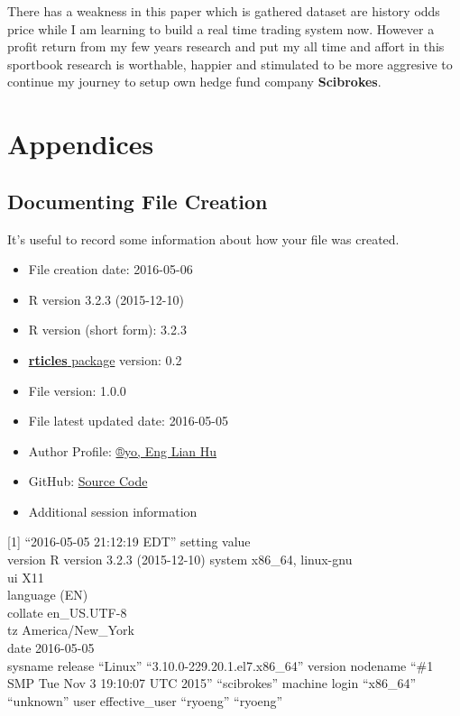 \documentclass[article]{jss}
\providecommand{\tightlist}{%
  \setlength{\itemsep}{0pt}\setlength{\parskip}{0pt}}
\begin{document}
There has a weakness in this paper which is gathered dataset are history
odds price while I am learning to build a real time trading system now.
However a profit return from my few years research and put my all time
and affort in this sportbook research is worthable, happier and
stimulated to be more aggresive to continue my journey to setup own
hedge fund company \textbf{Scibrokes}.

\section{Appendices}\label{appendices}

\subsection{Documenting File Creation}\label{documenting-file-creation}

It's useful to record some information about how your file was created.

\begin{itemize}
\tightlist
\item
  File creation date: 2016-05-06
\item
  R version 3.2.3 (2015-12-10)
\item
  R version (short form): 3.2.3
\item
  \href{https://github.com/rstudio/rticles}{\textbf{rticles} package}
  version: 0.2
\item
  File version: 1.0.0
\item
  File latest updated date: 2016-05-05
\item
  Author Profile:
  \href{https://beta.rstudioconnect.com/englianhu/ryo-eng/}{®yo, Eng
  Lian Hu}
\item
  GitHub:
  \href{https://github.com/scibrokes/odds-modelling-and-testing-inefficiency-of-sports-bookmakers}{Source
  Code}
\item
  Additional session information
\end{itemize}

{[}1{]} ``2016-05-05 21:12:19 EDT'' setting value\\
 version R version 3.2.3 (2015-12-10) system x86\_64, linux-gnu\\
 ui X11\\
 language (EN)\\
 collate en\_US.UTF-8\\
 tz America/New\_York\\
 date 2016-05-05\\
 sysname release ``Linux'' ``3.10.0-229.20.1.el7.x86\_64'' version
nodename ``\#1 SMP Tue Nov 3 19:10:07 UTC 2015'' ``scibrokes'' machine
login ``x86\_64'' ``unknown'' user effective\_user ``ryoeng'' ``ryoeng''
\end{document}

